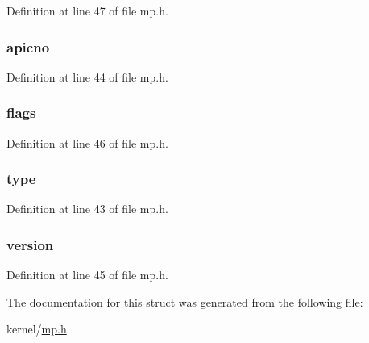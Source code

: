 Definition at line 47 of file mp.\-h.

\hypertarget{structmpioapic_ad5298ed5a85376e373300bfe473b5ceb}{
\subsubsection[{apicno}]{ apicno}}\label{structmpioapic_ad5298ed5a85376e373300bfe473b5ceb}


Definition at line 44 of file mp.\-h.

\hypertarget{structmpioapic_abe146a6a9523880d7ce48965f8d07b34}{
\subsubsection[{flags}]{ flags}}\label{structmpioapic_abe146a6a9523880d7ce48965f8d07b34}


Definition at line 46 of file mp.\-h.

\hypertarget{structmpioapic_a7720cfa5e476235d84bbe5bb8ad56959}{
\subsubsection[{type}]{ type}}\label{structmpioapic_a7720cfa5e476235d84bbe5bb8ad56959}


Definition at line 43 of file mp.\-h.

\hypertarget{structmpioapic_aa6ea6b1d12a723848cc34b199ddd8aef}{
\subsubsection[{version}]{ version}}\label{structmpioapic_aa6ea6b1d12a723848cc34b199ddd8aef}


Definition at line 45 of file mp.\-h.



The documentation for this struct was generated from the following file\-:\begin{DoxyCompactItemize}
\item 
kernel/\hyperlink{mp_8h}{mp.\-h}\end{DoxyCompactItemize}
